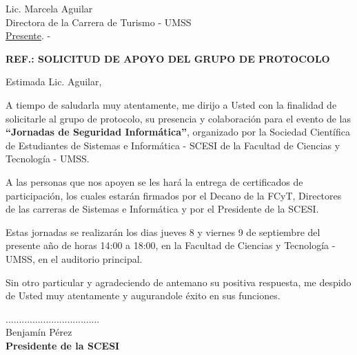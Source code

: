\documentclass[letterpaper,12pt]{letter}
\begin{document}
\date {1 de septiembre de 2011}
\begin{letter}{Lic. Marcela Aguilar \\ Directora de la Carrera de Turismo - UMSS \\ \underline {Presente}. -}

\begin{center}
	\opening{\textbf{REF.: SOLICITUD DE APOYO DEL GRUPO DE PROTOCOLO}}
\end{center}

Estimada Lic. Aguilar,

A tiempo de saludarla muy atentamente, me dirijo a Usted con la finalidad de solicitarle al grupo de protocolo, su presencia y 
colaboraci\'on para el evento de las {\bfseries ``Jornadas de Seguridad Inform\'atica''}, organizado por la Sociedad Cient\'ifica 
de Estudiantes de Sistemas e Inform\'atica - SCESI de la Facultad de Ciencias y Tecnolog\'ia - UMSS.

A las personas que nos apoyen se les har\'a la entrega de certificados de participaci\'on, los cuales estar\'an firmados por el
Decano de la FCyT, Directores de las carreras de Sistemas e Inform\'atica y por el Presidente de la SCESI.

Estas jornadas se realizar\'an los dias jueves 8 y viernes 9 de septiembre del presente a\~no de horas 14:00 a 
18:00, en la Facultad de Ciencias y Tecnolog\'ia - UMSS, en el auditorio principal.

Sin otro particular y agradeciendo de antemano su positiva respuesta, me despido de Usted muy atentamente y augurandole \'exito en sus funciones.\\

\vspace{3cm}

\begin{center}
...................................\\
Benjam\'in P\'erez\\
{\bfseries Presidente de la  SCESI}
\end{center}

\end{letter}
\end{document}
